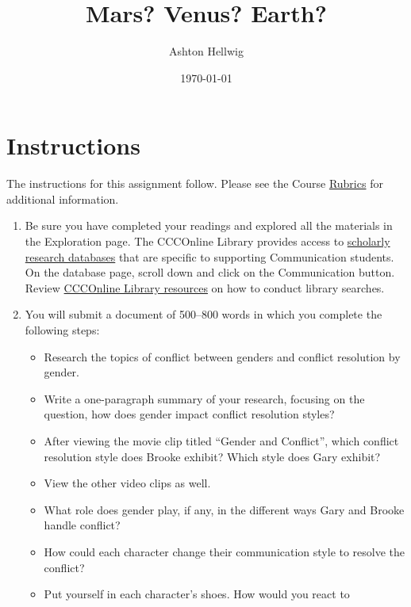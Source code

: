 \documentclass[stu,12pt]{apa7}
\title{%
    Mars? Venus? Earth?
  }
\author{Ashton Hellwig}
\date{\today}
\begin{document}
  \maketitle

  \section*{Instructions}
    The instructions for this assignment follow. Please see the Course
      \href{https://ccco.desire2learn.com/d2l/lp/rubrics/list.d2l?ou=2828527}%
      {Rubrics} for additional information.

    \begin{enumerate}
      \item Be sure you have completed your readings and explored all the
        materials in the Exploration page. The CCCOnline Library provides
        access to \href{http://www.ccconline.org/research-databases/}{%
        scholarly research databases} that are specific to supporting
        Communication students. On the database page, scroll down and click on
        the Communication button. Review
        \href{http://ccconline.libguides.com/LibraryDIY}{CCCOnline Library %
        resources} on how to conduct library searches.
      \item You will submit a document of 500--800 words in which you complete
        the following steps:
        \begin{itemize}
          \item Research the topics of conflict between genders and conflict
            resolution by gender.
          \item Write a one-paragraph summary of your research, focusing on the
            question, how does gender impact conflict resolution styles?
          \item After viewing the movie clip titled ``Gender and Conflict'',
            which conflict resolution style does Brooke exhibit? Which style
            does Gary exhibit?
          \item View the other video clips as well.
          \item What role does gender play, if any, in the different ways Gary
            and Brooke handle conflict?
          \item How could each character change their communication style to
            resolve the conflict?
          \item Put yourself in each character's shoes. How would you react to

\end{itemize}
\end{enumerate}
\end{document}
